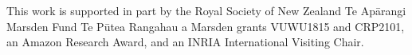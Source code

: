 \documentclass[english,submission]{programming}
\begin{document}





  
  
  
  
  

\acks
This work is supported in part by the Royal Society of New Zealand Te
Ap\={a}rangi  Marsden Fund Te P\={u}tea Rangahau a Marsden grants
VUWU1815 and CRP2101, an Amazon Research Award, and an INRIA
International Visiting Chair.
\end{document}
